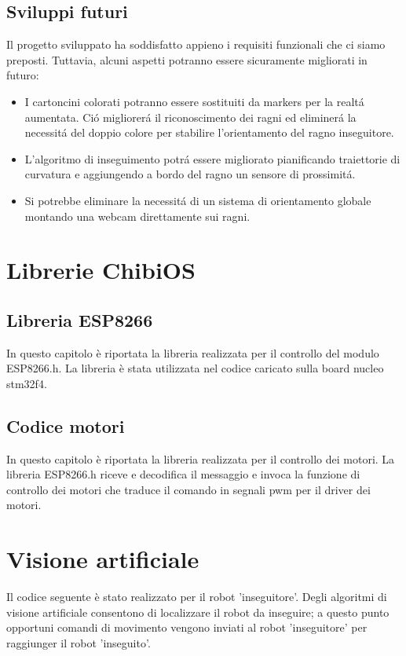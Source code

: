 \documentclass [11pt ,a4paper ,twoside ]{report}
\begin{document}
\section{Sviluppi futuri}
Il progetto sviluppato ha soddisfatto appieno i requisiti funzionali che ci siamo preposti. Tuttavia, alcuni aspetti potranno essere sicuramente migliorati in futuro:
\begin{itemize}
\item I cartoncini colorati potranno essere sostituiti da markers per la realt\'a aumentata. Ci\'o migliorer\'a il riconoscimento dei ragni ed eliminer\'a la necessit\'a del doppio colore per stabilire l'orientamento del ragno inseguitore. 
\item L'algoritmo di inseguimento potr\'a essere migliorato pianificando traiettorie di curvatura e aggiungendo a bordo del ragno un sensore di prossimit\'a.
\item Si potrebbe eliminare la necessit\'a di un sistema di orientamento globale montando una webcam direttamente sui ragni.
\end{itemize}


\begin{appendices}
  \chapter{Librerie ChibiOS}
		\section{Libreria ESP8266} \label{esp.h}
		In questo capitolo \`e riportata la libreria realizzata per il controllo del modulo ESP8266.h. La libreria \`e stata utilizzata nel codice caricato sulla board nucleo stm32f4.
		
	
	
	\section{Codice motori} \label{motor.h}
	In questo capitolo \`e riportata la libreria realizzata per il controllo dei motori. La libreria ESP8266.h riceve e decodifica il messaggio e invoca la funzione di controllo dei motori che traduce il comando in segnali pwm per il driver dei motori.


	\chapter{Visione artificiale} \label{vision}
	Il codice seguente \`e stato realizzato per il robot 'inseguitore'. Degli algoritmi di visione artificiale consentono di localizzare il robot da inseguire; a questo punto opportuni comandi di movimento vengono inviati al robot 'inseguitore' per raggiunger il robot 'inseguito'.

	
\end{appendices}
\end{document}
